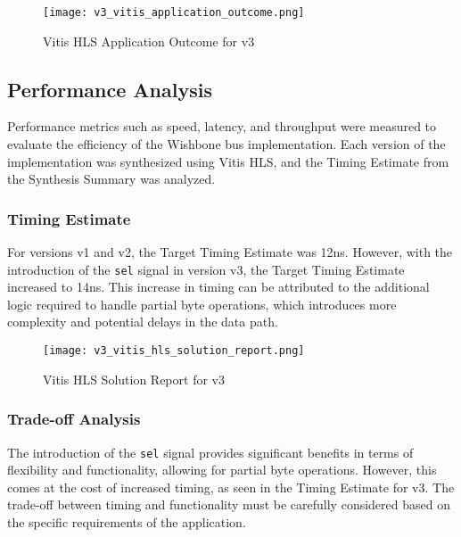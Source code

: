 \documentclass[conference]{IEEEtran}
\begin{document}
\begin{figure}[h]
    \centering
    \texttt{[image: v3\_vitis\_application\_outcome.png]}
    \caption{Vitis HLS Application Outcome for v3}
    \label{fig:v3_vitis_application_outcome}
\end{figure}

\subsection{Performance Analysis}
Performance metrics such as speed, latency, and throughput were measured to evaluate the efficiency of the Wishbone bus implementation. Each version of the implementation was synthesized using Vitis HLS, and the Timing Estimate from the Synthesis Summary was analyzed.

\subsubsection{Timing Estimate}
For versions v1 and v2, the Target Timing Estimate was 12ns. However, with the introduction of the \texttt{sel} signal in version v3, the Target Timing Estimate increased to 14ns. This increase in timing can be attributed to the additional logic required to handle partial byte operations, which introduces more complexity and potential delays in the data path.

\begin{figure}[h]
    \centering
    \texttt{[image: v3\_vitis\_hls\_solution\_report.png]}
    \caption{Vitis HLS Solution Report for v3}
    \label{fig:v3_vitis_hls_solution_report}
\end{figure}

\subsubsection{Trade-off Analysis}
The introduction of the \texttt{sel} signal provides significant benefits in terms of flexibility and functionality, allowing for partial byte operations. However, this comes at the cost of increased timing, as seen in the Timing Estimate for v3. The trade-off between timing and functionality must be carefully considered based on the specific requirements of the application.
\end{document}
